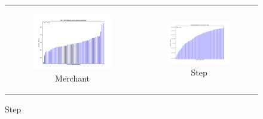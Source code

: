 \begin{figure}
{\begin{tabular}[c]{cc}
     \begin{subfigure}[c]{0.45\textwidth}
         \centering
         \includegraphics[width=\textwidth]{assets/results/syntheticFincances/distribution/merchant.png}
         \caption{Merchant}
         \label{}
     \end{subfigure} &
     
     \begin{subfigure}[c]{0.45\textwidth}
         \centering
         \includegraphics[width=\textwidth]{assets/results/syntheticFincances/distribution/step.png}
         \caption{Step}
         \label{}
     \end{subfigure} \\
     

\end{tabular}}
\end{figure}
